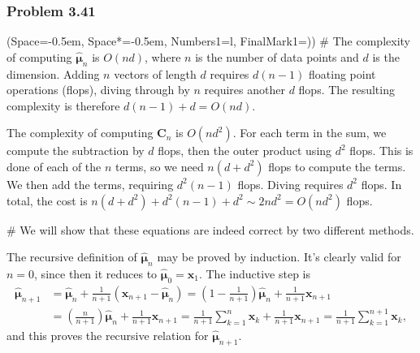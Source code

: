 \documentclass[12pt, a4paper]{article}
\newcommand{\listSpace}{-0.5em}%
\newcommand{\vect}[1]{\bm{#1}}
\begin{document}
\subsubsection*{Problem 3.41}
\begin{easylist}[enumerate]
\ListProperties(Space=\listSpace, Space*=\listSpace, Numbers1=l, FinalMark1={)})
# The complexity of computing $\hat{\vect{\mu}}_n$ is $O\left(nd\right)$, where $n$ is the number of data points and $d$ is the dimension.
Adding $n$ vectors of length $d$ requires $d(n-1)$ floating point operations (flops), diving through by $n$ requires another $d$ flops.
The resulting complexity is therefore $d(n-1) + d = O(nd)$.

The complexity of computing $\vect{C}_n$ is $O\left(nd^2\right)$.
For each term in the sum, we compute the subtraction by $d$ flops, then the outer product using $d^2$ flops.
This is done of each of the $n$ terms, so we need $n(d + d^2)$ flops to compute the terms.
We then add the terms, requiring $d^2(n-1)$ flops.
Diving requires $d^2$ flops.
In total, the cost is $n(d + d^2) + d^2(n-1) + d^2 \sim 2nd^2 = O(nd^2)$ flops.

# We will show that these equations are indeed correct by two different methods.


The recursive definition of $\hat{\vect{\mu}}_n$ may be proved by induction.
It's clearly valid for $n=0$, since then it reduces to $\hat{\vect{\mu}}_0 = \vect{x}_1$.
The inductive step is
\begin{align*}
	\hat{\vect{\mu}}_{n+1} &= \hat{\vect{\mu}}_{n} +  \frac{1}{n +1} \left( \vect{x}_{n+1} -  \hat{\vect{\mu}}_{n} \right)
	= 
	\left(1 - \frac{1}{n+1}\right) \hat{\vect{\mu}}_{n}  + \frac{1}{n + 1} \vect{x}_{n+1} \\
	&= 
	\left(\frac{n}{n+1}\right) \hat{\vect{\mu}}_{n}  + \frac{1}{n + 1} \vect{x}_{n+1} = 
	\frac{1}{n+1} \sum_{k=1}^{n} \vect{x}_{k} + \frac{1}{n+1} \vect{x}_{n+1}
	 = \frac{1}{n+1} \sum_{k=1}^{n+1} \vect{x}_{k},
\end{align*}
and this proves the recursive relation for $\hat{\vect{\mu}}_{n+1}$.


\end{easylist}
\end{document}
